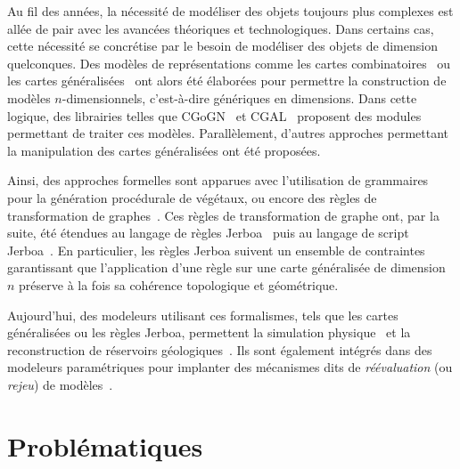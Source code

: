 Au fil des années, la nécessité de modéliser des objets toujours plus complexes
est allée de pair avec les avancées théoriques et technologiques. %
Dans certains cas, cette nécessité se concrétise par le besoin de modéliser des
objets de dimension quelconques. %
Des modèles de représentations comme les cartes
combinatoires~\cite{vince1983combinatorial} ou les cartes
généralisées~\cite{lienhardt1991topological, Damiand-Lienhardt14} ont alors été
élaborées pour permettre la construction de modèles \(n\)-dimensionnels,
c'est-à-dire génériques en dimensions. %
Dans cette logique, des librairies telles que CGoGN~\cite{kraemer2014cgogn} et
CGAL~\cite{cgal:d-cm-24b, cgal:d-gm-24b} proposent des modules permettant de
traiter ces modèles. %
Parallèlement, d'autres approches permettant la manipulation des cartes
généralisées ont été proposées. %

Ainsi, des approches formelles sont apparues avec l'utilisation de
grammaires~\cite{prusinkiewicz1990algorithmic, worth2005growing, burry2010new,
  bohl2015modeling} pour la génération procédurale de végétaux, ou encore des
règles de transformation de graphes~\cite{poudret2008graph}. %
Ces règles de transformation de graphe ont, par la suite, été étendues au
langage de règles Jerboa~\cite{belhaouari2014jerboa,
  Bellet-Arnould-Belhaouari-LeGall2017} puis au langage de script
Jerboa~\cite{gauth2019}. %
En particulier, les règles Jerboa suivent un ensemble de contraintes
garantissant que l'application d'une règle sur une carte généralisée de
dimension \(n\) préserve à la fois sa cohérence topologique et géométrique. %

Aujourd'hui, des modeleurs utilisant ces formalismes, tels que les cartes généralisées ou les règles Jerboa, permettent la simulation physique~\cite{BenSalah-Belhaouari-Arnould-Meseure2017b} et la reconstruction de réservoirs
géologiques~\cite{gauthier2016topological, gauth2019}. %
Ils sont également intégrés dans des modeleurs paramétriques pour implanter des
mécanismes dits de \emph{réévaluation} (ou \emph{rejeu}) de
modèles~\cite{babaali2010systeme, cardot2019}. %



\section*{Problématiques}
\renewcommand\sectionname{Problématique}
\markboth{Introduction}{\sectionname}


